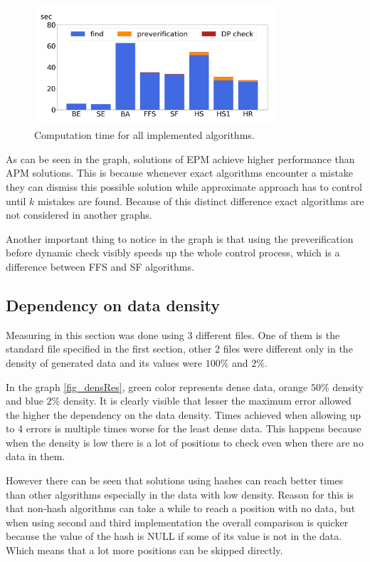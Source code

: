 \begin{figure}
\centering
\includegraphics[width=0.8\textwidth]{img/baseAll}
\caption{Computation time for all implemented algorithms.}
\label{fig_compT}
\end{figure}

As can be seen in the graph, solutions of EPM achieve higher performance than APM solutions. This is because whenever exact algorithms encounter a mistake they can dismiss this possible solution while approximate approach has to control until $k$ mistakes are found. Because of this distinct difference exact algorithms are not considered in another graphs.

Another important thing to notice in the graph is that using the preverification before dynamic check visibly speeds up the whole control process, which is a difference between FFS and SF algorithms. 

\subsection{Dependency on data density}
Measuring in this section was done using 3 different files. One of them is the standard file specified in the first section, other 2 files were different only in the density of generated data and its values were $100 \%$ and $2 \%$.

In the graph \ref{fig_densRes}, green color represents dense data, orange $50 \%$ density and blue $2 \%$ density. It is clearly visible that lesser the maximum error allowed the higher the dependency on the data density. Times achieved when allowing up to 4 errors is multiple times worse for the least dense data. This happens because when the density is low there is a lot of positions to check even when there are no data in them. 

However there can be seen that solutions using hashes can reach better times than other algorithms especially in the data with low density. Reason for this is that non-hash algorithms can take a while to reach a position with no data, but when using second and third implementation the overall comparison is quicker because the value of the hash is NULL if some of its value is not in the data. Which means that a lot more positions can be skipped directly.

